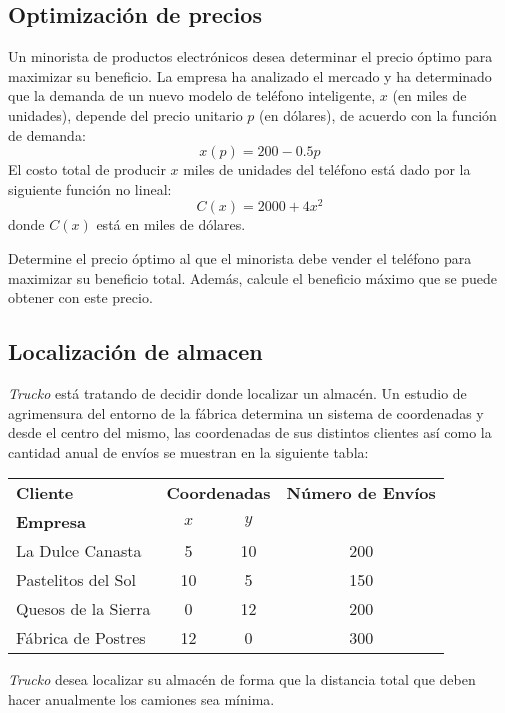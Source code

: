 \documentclass[12pt]{article}
\begin{document}
\subsection{Optimización de precios}

Un minorista de productos electr\'{o}nicos desea determinar el precio \'{o}ptimo para maximizar su beneficio. La empresa ha analizado el mercado y ha determinado que la demanda de un nuevo modelo de tel\'{e}fono inteligente, $x$ (en miles de unidades), depende del precio unitario $p$ (en d\'{o}lares), de acuerdo con la funci\'{o}n de demanda:
\[ x(p) = 200 - 0.5p \]
El costo total de producir $x$ miles de unidades del tel\'{e}fono est\'{a} dado por la siguiente funci\'{o}n no lineal:
\[ C(x) = 2000 + 4x^2 \]
donde $C(x)$ est\'{a} en miles de d\'{o}lares.

Determine el precio \'{o}ptimo al que el minorista debe vender el tel\'{e}fono para maximizar su beneficio total. Adem\'{a}s, calcule el beneficio m\'{a}ximo que se puede obtener con este precio.

\subsection{Localización de almacen}

\textit{Trucko} está tratando de decidir donde localizar un almacén. Un estudio de agrimensura del entorno de la fábrica determina un sistema de coordenadas y desde el centro del mismo, las coordenadas de sus distintos clientes así como la cantidad anual de envíos se muestran en la siguiente tabla:
\begin{table}[h!]
    \centering
    \label{tab:shipments}
    \begin{tabular}{lccc}
        \toprule
        \textbf{Cliente} & \multicolumn{2}{c}{\textbf{Coordenadas}} & \textbf{Número de Envíos} \\
        \cmidrule(lr){2-3}
        \textbf{Empresa} & \textbf{$x$} & \textbf{$y$} & \\
        \midrule
        La Dulce Canasta & 5 & 10 & 200 \\
        Pastelitos del Sol & 10 & 5 & 150 \\
        Quesos de la Sierra & 0 & 12 & 200 \\
        Fábrica de Postres & 12 & 0 & 300 \\
        \bottomrule
    \end{tabular}
\end{table}

\textit{Trucko} desea localizar su almacén de forma que la distancia total que deben hacer anualmente los camiones sea mínima. 
\end{document}
